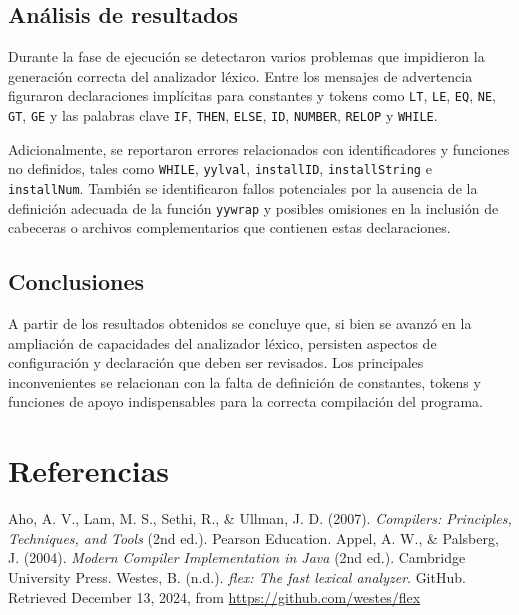 \documentclass{article}
\begin{document}
\subsection{Análisis de resultados}

Durante la fase de ejecución se detectaron varios problemas que impidieron la generación correcta del analizador léxico. Entre los mensajes de advertencia figuraron declaraciones implícitas para constantes y tokens como \texttt{LT}, \texttt{LE}, \texttt{EQ}, \texttt{NE}, \texttt{GT}, \texttt{GE} y las palabras clave \texttt{IF}, \texttt{THEN}, \texttt{ELSE}, \texttt{ID}, \texttt{NUMBER}, \texttt{RELOP} y \texttt{WHILE}. 

Adicionalmente, se reportaron errores relacionados con identificadores y funciones no definidos, tales como \texttt{WHILE}, \texttt{yylval}, \texttt{installID}, \texttt{installString} e \texttt{installNum}. También se identificaron fallos potenciales por la ausencia de la definición adecuada de la función \texttt{yywrap} y posibles omisiones en la inclusión de cabeceras o archivos complementarios que contienen estas declaraciones.

\subsection{Conclusiones }

A partir de los resultados obtenidos se concluye que, si bien se avanzó en la ampliación de capacidades del analizador léxico, persisten aspectos de configuración y declaración que deben ser revisados. Los principales inconvenientes se relacionan con la falta de definición de constantes, tokens y funciones de apoyo indispensables para la correcta compilación del programa.

\section{Referencias}
\renewcommand{\refname}{}
\begin{thebibliography}{9}
Aho, A. V., Lam, M. S., Sethi, R., \& Ullman, J. D. (2007). \textit{Compilers: Principles, Techniques, and Tools} (2nd ed.). Pearson Education.
Appel, A. W., \& Palsberg, J. (2004). \textit{Modern Compiler Implementation in Java} (2nd ed.). Cambridge University Press.
Westes, B. (n.d.). \textit{flex: The fast lexical analyzer}. GitHub. Retrieved December 13, 2024, from \url{https://github.com/westes/flex}

\end{thebibliography}
\end{document}
